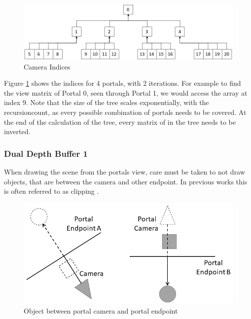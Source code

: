 
\begin{figure}[h]
	\includegraphics[width=\linewidth]{images/cameraindices.png}
	\caption{Camera Indices}
	\label{fig:cameraindices}
\end{figure}

Figure \ref{fig:cameraindices} shows the indices for 4 portals, with 2 iterations. For example to find the view matrix of Portal 0, seen through Portal 1, we would access the array at index 9. Note that the size of the tree scales exponentially, with the \gls{recursioncount}, as every possible combination of portals needs to be covered. At the end of the calculation of the tree, every matrix of in the tree needs to be inverted.


\subsubsection{Dual Depth Buffer 1}

When drawing the scene from the portals view, care must be taken to not draw objects, that are between the camera and other endpoint. In previous works this is often referred to as clipping \cite{lowe:2005:technique}.
\begin{figure}[h]
	\includegraphics[width=\linewidth]{images/bananajuce.png}
	\caption{Object between portal camera and portal endpoint}
	\label{fig:bananajuce}
\end{figure}


